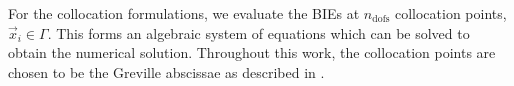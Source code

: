 For the collocation formulations, we evaluate the BIEs at $n_{\mathrm{dofs}}$ collocation points, $\vec{x}_i\in\Gamma$. This forms an algebraic system of equations which can be solved to obtain the numerical solution. Throughout this work, the collocation points are chosen to be the Greville abscissae as described in \cite{Scott2013ibe}. 

